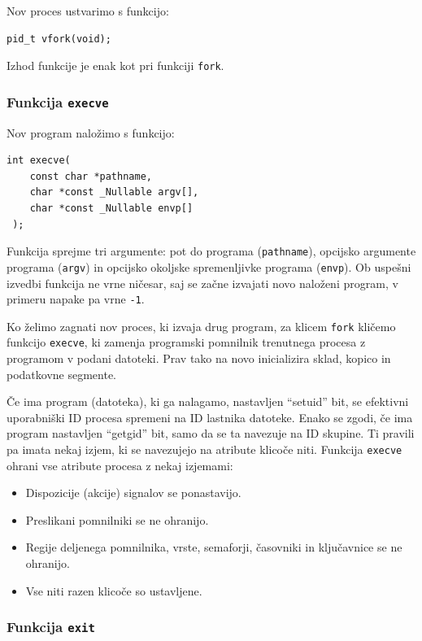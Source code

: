 \documentclass[a4paper,12pt,openright]{book}
\begin{document}
Nov proces ustvarimo s funkcijo:
\begin{lstlisting}[style=func]
 pid_t vfork(void);
\end{lstlisting}

Izhod funkcije je enak kot pri funkciji \texttt{fork}.

\subsubsection{Funkcija \texttt{execve}}

Nov program naložimo s funkcijo:
\begin{lstlisting}[style=func]
 int execve(
	const char *pathname,
	char *const _Nullable argv[],
	char *const _Nullable envp[]
 );
\end{lstlisting}

Funkcija sprejme tri argumente: pot do programa (\texttt{pathname}), opcijsko argumente programa (\texttt{argv}) in opcijsko okoljske spremenljivke programa (\texttt{envp}).
Ob uspešni izvedbi funkcija ne vrne ničesar, saj se začne izvajati novo naloženi program, v primeru napake pa vrne \texttt{-1}.

Ko želimo zagnati nov proces, ki izvaja drug program, za klicem \texttt{fork} kličemo funkcijo \texttt{execve}, ki zamenja programski pomnilnik trenutnega procesa z programom v podani datoteki.
Prav tako na novo inicializira sklad, kopico in podatkovne segmente.

Če ima program (datoteka), ki ga nalagamo, nastavljen ``setuid'' bit, se efektivni uporabniški ID procesa spremeni na ID lastnika datoteke.
Enako se zgodi, če ima program nastavljen ``getgid'' bit, samo da se ta navezuje na ID skupine.
Ti pravili pa imata nekaj izjem, ki se navezujejo na atribute klicoče niti.
Funkcija \texttt{execve} ohrani vse atribute procesa z nekaj izjemami:
\begin{itemize}
	\item Dispozicije (akcije) signalov se ponastavijo.
	\item Preslikani pomnilniki se ne ohranijo.
	\item Regije deljenega pomnilnika, vrste, semaforji, časovniki in ključavnice se ne ohranijo.
	\item Vse niti razen klicoče so ustavljene.
\end{itemize}

\subsubsection{Funkcija \texttt{exit}}
\end{document}
